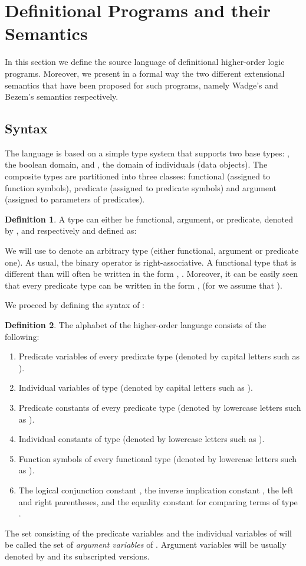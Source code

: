 \documentclass[submission,copyright]{eptcs}
\theoremstyle{definition}
\newtheorem{definition}{Definition}
\begin{document}
\section{Definitional Programs and their Semantics}
\label{sec:lang}
\label{section3}
In this section we define the source language  of definitional
higher-order logic programs. Moreover, we present in a formal way the two
different extensional semantics that have been proposed for such programs,
namely Wadge's and Bezem's semantics respectively.

\subsection{Syntax}
The language  is based on a simple
type system that supports two base types: , the boolean domain,
and , the domain of individuals (data objects). The composite
types are partitioned into three classes: functional (assigned to
function symbols), predicate (assigned to predicate symbols) and
argument (assigned to parameters of predicates).


\begin{definition}
A type can either be functional, argument, or predicate, denoted by , 
and  respectively and defined as:

\end{definition}

We will use  to denote an arbitrary type (either functional, argument or predicate one).
As usual, the binary operator  is right-associative. A
functional type that is different than  will often be written
in the form , . Moreover, it can
be easily seen that every predicate type  can be written in the
form ,
 (for  we assume that ).

We proceed by defining the syntax of :
\begin{definition}
The alphabet of the higher-order language  consists of the following:
\begin{enumerate}
  \item Predicate variables of every predicate type  (denoted by capital letters such as
      ).
  \item Individual variables of type  (denoted by capital letters such as
      ).
  \item Predicate constants of every predicate type  (denoted by lowercase letters such as
      ).
  \item Individual constants of type  (denoted by lowercase
      letters such as ).
  \item Function symbols of every functional type  (denoted by lowercase letters such as ).
  \item The logical conjunction constant , the inverse implication constant , the left and right parentheses,
        and the equality constant  for comparing terms of type .
\end{enumerate}
\end{definition}
The set consisting of the predicate variables and the individual variables of 
will be called the set of {\em argument variables} of . Argument variables will
be usually denoted by  and its subscripted versions.
\end{document}
